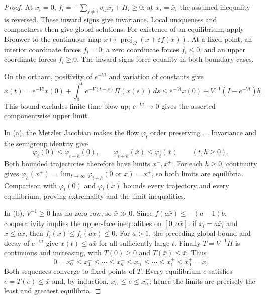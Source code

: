 \begin{proof}
At $x_i=0$,
$f_i=-\sum_{j\ne i}v_{ij}x_j+\Pi_i\ge0$; at $x_i=\bar x_i$ the
assumed inequality is reversed. These inward signs give invariance.
Local uniqueness and compactness then give global solutions.
For existence of an equilibrium, apply Brouwer to the continuous map
$x\mapsto\operatorname{proj}_\Omega(x+\varepsilon f(x))$.
At a fixed point, an interior coordinate forces $f_i=0$;
a zero coordinate forces $f_i\le0$, and an upper coordinate forces
$f_i\ge0$. The inward signs force equality in both boundary cases.

On the orthant, positivity of $e^{-Vt}$ and variation of constants give
\[
 x(t)=e^{-Vt}x(0)+\int_0^t e^{-V(t-s)}\Pi(x(s))\,ds
 \le e^{-Vt}x(0)+V^{-1}(I-e^{-Vt})b.
\]
This bound excludes finite-time blow-up; $e^{-Vt}\to0$ gives
the asserted componentwise upper limit.

In (a), the Metzler Jacobian makes the flow $\varphi_t$ order preserving
\cite{smith1995}, \cite{Hirsch}. Invariance and the semigroup identity give
\[
 \varphi_t(0)\le\varphi_{t+h}(0),\qquad
 \varphi_{t+h}(\bar x)\le\varphi_t(\bar x)\qquad(t,h\ge0).
\]
Both bounded trajectories therefore have limits $x^-,x^+$.
For each $h\ge0$, continuity gives
$\varphi_h(x^\pm)=\lim_{t\to\infty}\varphi_{t+h}(0\text{ or }\bar x)=x^\pm$,
so both limits are equilibria.
Comparison with $\varphi_t(0)$ and $\varphi_t(\bar x)$ bounds every trajectory
and every equilibrium, proving extremality and the limit inequalities.

In (b), $V^{-1}\ge0$ has no zero row, so $\bar x\gg0$.
Since $f(a\bar x)\le-(a-1)b$, cooperativity implies the upper-face
inequalities on $[0,a\bar x]$: if $x_i=a\bar x_i$ and $x\le a\bar x$,
then $f_i(x)\le f_i(a\bar x)\le0$.
For $a>1$, the preceding global bound and decay of $e^{-Vt}$ give
$x(t)\le a\bar x$ for all sufficiently large $t$.
Finally $T=V^{-1}\Pi$ is continuous and increasing, with
$T(0)\ge0$ and $T(\bar x)\le\bar x$. Thus
\[
 0=x_0^-\le x_1^-\le\cdots\le x_n^-\le x_n^+\le\cdots
 \le x_1^+\le x_0^+=\bar x .
\]
Both sequences converge to fixed points of $T$. Every equilibrium
$e$ satisfies $e=T(e)\le\bar x$ and, by induction,
$x_n^-\le e\le x_n^+$; hence the limits are precisely the least
and greatest equilibria.
\end{proof}

